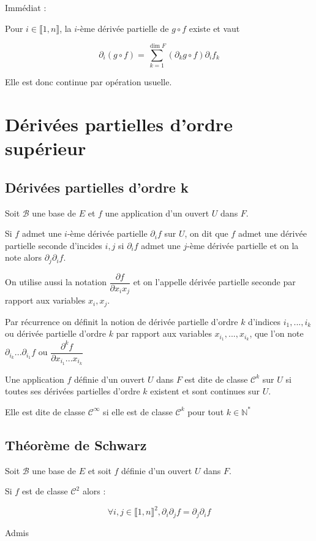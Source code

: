 \documentclass[a4paper,12pt]{book}
\newcommand{\Def}[2]{\begin{tcolorbox}[sharp corners, colback=white,colframe=blue!90!black!75, title=Définition : #1]#2\end{tcolorbox}}
\newcommand{\Thr}[2]{\begin{tcolorbox}[sharp corners, colback=white,colframe=red!90!black!75, title=Théorème : #1]#2\end{tcolorbox}}
\newcommand{\Pre}[1]{\begin{tcolorbox}[sharp corners, colback=white,colframe=green!60!green!30!black!75, title=Preuve]#1\end{tcolorbox}}
\def\N{\mathbb{N}}
\begin{document}
\Pre{Immédiat :
\par Pour $i\in\llbracket 1, n\rrbracket$, la $i$-ème dérivée partielle de $g\circ f$ existe et vaut
\par $$\partial_i (g\circ f) = \sum\limits_{k=1}^{\dim F} (\partial_kg\circ f)\partial_if_k$$
\par Elle est donc continue par opération usuelle.}

\section{Dérivées partielles d'ordre supérieur}
\subsection{Dérivées partielles d'ordre k}
\Def{}{Soit $\mathcal{B}$ une base de $E$ et $f$ une application d'un ouvert $U$ dans $F$.
\par Si $f$ admet une $i$-ème dérivée partielle $\partial_if$ sur $U$, on dit que $f$ admet une dérivée partielle seconde d'incides $i, j$ si $\partial_if$ admet une $j$-ème dérivée partielle et on la note alors $\partial_j\partial_i f$.
\par On utilise aussi la notation $\dfrac{\partial f}{\partial x_ix_j}$ et on l'appelle dérivée partielle seconde par rapport aux variables $x_i, x_j$.
\par Par récurrence on définit la notion de dérivée partielle d'ordre $k$ d'indices $i_1,..., i_k$ ou dérivée partielle d'ordre $k$ par rapport aux variables $x_{i_1},..., x_{i_k}$, que l'on note $\partial_{i_k}...\partial_{i_1}f$ ou $\dfrac{\partial^kf}{\partial x_{i_1}...x_{i_k}}$}
\Def{}{Une application $f$ définie d'un ouvert $U$ dans $F$ est dite de classe $\mathcal{C}^k$ sur $U$ si toutes ses dérivées partielles d'ordre $k$ existent et sont continues sur $U$.
\par Elle est dite de classe $\mathcal{C}^\infty$ si elle est de classe $\mathcal{C}^k$ pour tout $k\in\N^*$}

\subsection{Théorème de Schwarz}
\Thr{Schwarz}{Soit $\mathcal{B}$ une base de $E$ et soit $f$ définie d'un ouvert $U$ dans $F$.
\par Si $f$ est de classe $\mathcal{C}^2$ alors :
\par $$\forall i,j\in\llbracket 1, n\rrbracket^2, \partial_i\partial_jf = \partial_j\partial_if$$}
\Pre{Admis}
\end{document}
